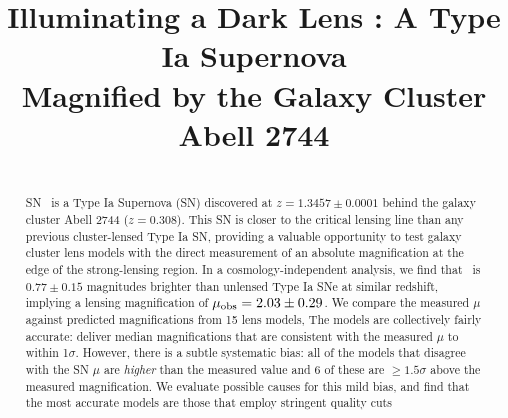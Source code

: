 







\title{Illuminating a Dark Lens : A Type Ia Supernova \\ Magnified by the Galaxy Cluster Abell 2744}




\begin{abstract}
\\
SN \tomas\ is a Type Ia Supernova (SN) discovered at
$z=1.3457\pm0.0001$ behind the galaxy cluster Abell 2744
($z=0.308$). This SN 
is closer to the critical lensing line than any
previous cluster-lensed Type Ia SN, 
providing a valuable
opportunity to test galaxy cluster lens models
with the direct measurement of an absolute magnification at the edge
of the strong-lensing region.  
In a cosmology-independent analysis, we find that \tomas\ is
$0.77\pm0.15$ magnitudes brighter than unlensed Type Ia SNe at similar
redshift, implying a lensing magnification of 
$\mu_{\rm obs}=2.03\pm0.29$. 
  We compare the measured $\mu$
against predicted magnifications from 15 lens models,   The models are collectively
fairly accurate:  deliver median magnifications that are consistent with the
measured $\mu$ to within 1$\sigma$.  However, there is a subtle
systematic bias: all of the models that disagree with the SN $\mu$ 
are {\it higher} than the measured value and 6 of these
are $\geq1.5\sigma$ above the measured magnification.  We
evaluate possible causes for this mild bias,
and find that
the most accurate models are those that employ stringent quality cuts
\end{abstract}

